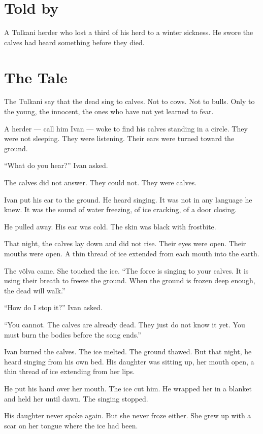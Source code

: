 \documentclass[10pt,twoside]{book}
\begin{document}
\section*{Told by}
A Tulkani herder who lost a third of his herd to a winter sickness. He swore the calves had heard something before they died.

\section*{The Tale}
The Tulkani say that the dead sing to calves. Not to cows. Not to bulls. Only to the young, the innocent, the ones who have not yet learned to fear.

A herder --- call him Ivan --- woke to find his calves standing in a circle. They were not sleeping. They were listening. Their ears were turned toward the ground.

``What do you hear?'' Ivan asked.

The calves did not answer. They could not. They were calves.

Ivan put his ear to the ground. He heard singing. It was not in any language he knew. It was the sound of water freezing, of ice cracking, of a door closing.

He pulled away. His ear was cold. The skin was black with frostbite.

That night, the calves lay down and did not rise. Their eyes were open. Their mouths were open. A thin thread of ice extended from each mouth into the earth.

The völva came. She touched the ice. ``The force is singing to your calves. It is using their breath to freeze the ground. When the ground is frozen deep enough, the dead will walk.''

``How do I stop it?'' Ivan asked.

``You cannot. The calves are already dead. They just do not know it yet. You must burn the bodies before the song ends.''

Ivan burned the calves. The ice melted. The ground thawed. But that night, he heard singing from his own bed. His daughter was sitting up, her mouth open, a thin thread of ice extending from her lips.

He put his hand over her mouth. The ice cut him. He wrapped her in a blanket and held her until dawn. The singing stopped.

His daughter never spoke again. But she never froze either. She grew up with a scar on her tongue where the ice had been.
\end{document}
